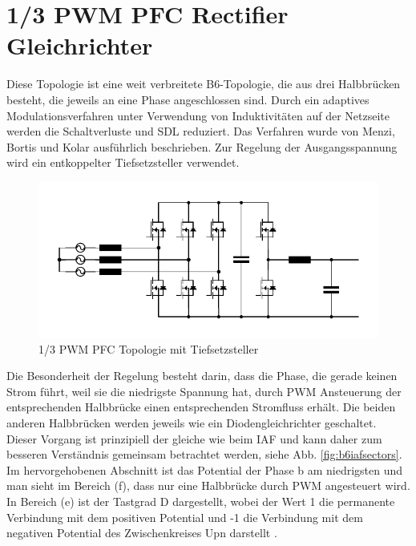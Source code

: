 \section{1/3 PWM PFC Rectifier Gleichrichter}
	\label{sec:GrundlagenB6}
	Diese Topologie ist eine weit verbreitete B6-Topologie, die aus drei Halbbrücken besteht, die jeweils an eine Phase angeschlossen sind. Durch ein adaptives Modulationsverfahren unter Verwendung von Induktivitäten auf der Netzseite werden die Schaltverluste und \gls{SDL} reduziert. Das Verfahren wurde von Menzi, Bortis und Kolar \cite{13PWMPFC} ausführlich beschrieben. Zur Regelung der Ausgangsspannung wird ein entkoppelter Tiefsetzsteller verwendet.\\
	
	\begin{figure}
		\centering
		\includegraphics[width=0.9\linewidth]{content/Grafiken/B6_Buck}
		\caption[1/3 PWM PFC Topologie mit Tiefsetzsteller]{1/3 PWM PFC Topologie mit Tiefsetzsteller}
		\label{fig:b6buck}
	\end{figure}
	
	Die Besonderheit der Regelung besteht darin, dass die Phase, die gerade keinen Strom führt, weil sie die niedrigste Spannung hat, durch \gls{PWM} Ansteuerung der entsprechenden Halbbrücke einen entsprechenden Stromfluss erhält. Die beiden anderen Halbbrücken werden jeweils wie ein Diodengleichrichter geschaltet. Dieser Vorgang ist prinzipiell der gleiche wie beim \gls{IAF} und kann daher zum besseren Verständnis gemeinsam betrachtet werden, siehe Abb. \ref{fig:b6iafsectors}.
	Im hervorgehobenen Abschnitt ist das Potential der Phase b am niedrigsten und man sieht im Bereich (f), dass nur eine Halbbrücke durch \gls{PWM} angesteuert wird. In Bereich (e) ist der Tastgrad \gls{D} dargestellt, wobei der Wert 1 die permanente Verbindung mit dem positiven Potential und -1 die Verbindung mit dem negativen Potential des Zwischenkreises \gls{Upn} darstellt \cite{13PWMPFC}.\\ 
		
